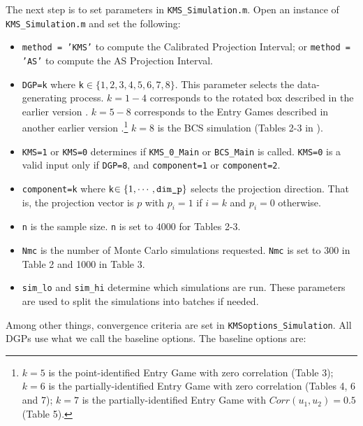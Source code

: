 \documentclass[12pt]{article}
\def\code#1{\texttt{#1}}
\begin{document}
The next step is to set parameters in \code{KMS\_Simulation.m}.  Open an instance of \code{KMS\_Simul\-ation.m} and set the following:
\begin{itemize}
\item \code{method = 'KMS'} to compute the Calibrated Projection Interval; or \code{method = 'AS'} to compute the AS Projection Interval.
\item \code{DGP=k} where \code{k}$\in \{1,2,3,4,5,6,7,8\}$. This parameter selects the data-generating process.  $k=1-4$ corresponds to the rotated box described in the earlier version . $k=5-8$ corresponds to the Entry Games described in another earlier version \cite{kaido2017confidence}.\footnote{$k=5$ is the point-identified Entry Game with zero correlation (Table 3); $k=6$ is the partially-identified Entry Game with zero correlation (Tables 4, 6 and 7); $k=7$ is the partially-identified Entry Game with $Corr(u_1,u_2) = 0.5$ (Table 5).}    $k=8$ is the BCS simulation (Tables 2-3 in ).
\item \code{KMS=1} or \code{KMS=0} determines if \code{KMS\_0\_Main} or \code{BCS\_Main} is called. \code{KMS=0} is a valid input only if \code{DGP=8}, and  \code{component=1} or \code{component=2}.
\item \code{component=k} where \code{k}$\in \{1,\cdots,\text{\code{dim\_p}}\}$ selects the projection direction.  That is, the projection vector is $p$ with $p_i = 1$ if $i=k$ and $p_i = 0$ otherwise.
\item \code{n} is the sample size.  \code{n} is set to $4000$ for Tables 2-3.
\item \code{Nmc} is the number of Monte Carlo simulations requested.  \code{Nmc} is set to 300 in Table 2 and 1000 in Table 3.
\item \code{sim\_lo} and \code{sim\_hi} determine which simulations are run.  These parameters are used to split the simulations into batches if needed.
\end{itemize}
 Among other things, convergence criteria  are set in \code{KMSoptions\_Simulation}.  All DGPs use what we call the baseline options.  %
The baseline options are:
\end{document}

